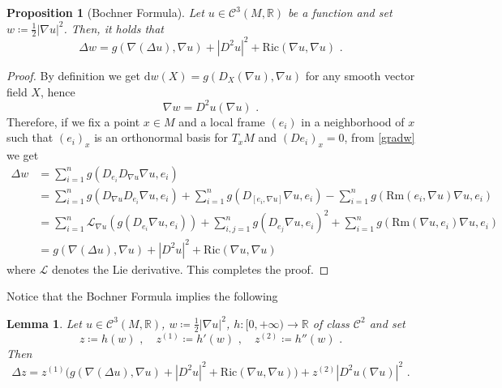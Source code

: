 \documentclass[10pt, a4paper, reqno, oneside]{amsart}
\theoremstyle{plain}
\newtheorem{prop}[theo]{Proposition}
\theoremstyle{definition}
\theoremstyle{plain}
\newtheorem{lemma}[theo]{Lemma}
\theoremstyle{definition}
\theoremstyle{plain}
\renewcommand{\=}{:=}
\begin{document}
\begin{prop}[Bochner Formula]
Let $u \in \mathcal{C}^3(M,\mathbb{R})$ be a function and set $w \coloneqq \tfrac12|\nabla u |^2$. Then, it holds that
\begin{equation} \label{bw1}
\Delta w = g(\nabla(\Delta u),\nabla u) + |D^2u|^2 + \mathrm{Ric}(\nabla u,\nabla u) \,\, .
\end{equation}
\end{prop}

\begin{proof}
By definition we get $\mathrm{d} w(X) = g(D_X(\nabla u), \nabla u)$ for any smooth vector field $X$, hence
\begin{equation} \label{gradw}
\nabla w = D^2u(\nabla u) \,\, .
\end{equation}
Therefore, if we fix a point $x \in M$ and a local frame $(e_i)$ in a neighborhood of $x$ such that $(e_i)_x$ is an orthonormal basis for $T_xM$ and $(D e_i)_x=0$, from \eqref{gradw} we get
\begin{align*}
\Delta w &= \sum_{i=1}^n g(D_{e_i}D_{\nabla u} \nabla u , e_i) \\
&= \sum_{i=1}^n g(D_{\nabla u}D_{e_i} \nabla u , e_i) +\sum_{i=1}^ng(D_{[e_i,\nabla u]} \nabla u , e_i) -\sum_{i=1}^ng(\mathrm{Rm}(e_i,\nabla u)\nabla u,e_i) \\
&= \sum_{i=1}^n \mathcal{L}_{\nabla u}(g(D_{e_i} \nabla u, e_i)) +\sum_{i,j=1}^n g(D_{e_j} \nabla u, e_i)^2 +\sum_{i=1}^ng(\mathrm{Rm}(\nabla u,e_i)\nabla u,e_i) \\
&= g(\nabla(\Delta u),\nabla u) + |D^2u|^2 + \mathrm{Ric}(\nabla u,\nabla u)
\end{align*}
where $\mathcal{L}$ denotes the Lie derivative. This completes the proof.
\end{proof}

Notice that the Bochner Formula implies the following

\begin{lemma}\label{lemboc}
Let $u \in \mathcal{C}^3(M,\mathbb{R})$, $w \coloneqq \tfrac12|\nabla u |^2$, $h: [0,+\infty) \to \mathbb{R}$ of class $\mathcal{C}^2$ and set
$$z \coloneqq h(w) \,\, , \quad z^{(1)} \coloneqq h'(w) \,\, , \quad z^{(2)} \coloneqq h''(w) \,\, .$$
Then
\begin{equation} \label{bw2}
\Delta z = z^{(1)}\big(g(\nabla(\Delta u),\nabla u) + |D^2u|^2 + \mathrm{Ric}(\nabla u,\nabla u)\big)+z^{(2)}|D^2u(\nabla u)|^2 \,\, . 
\end{equation}
\end{lemma}
\end{document}
